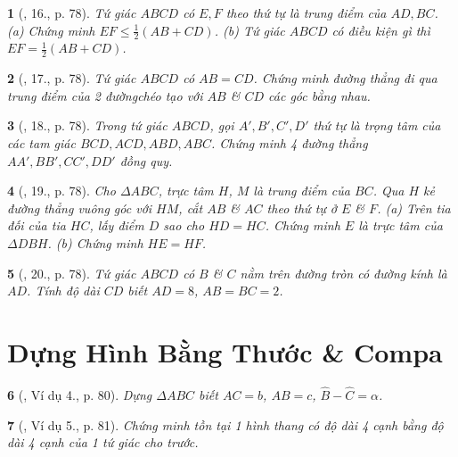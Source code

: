 \documentclass{article}
\newtheorem{baitoan}{}
\begin{document}
\begin{baitoan}[\cite{Binh_Toan_8_tap_1}, 16., p. 78]
	Tứ giác $ABCD$ có $E,F$ theo thứ tự là trung điểm của $AD,BC$. (a) Chứng minh $EF\le\frac{1}{2}(AB + CD)$. (b) Tứ giác $ABCD$ có điều kiện gì thì $EF = \frac{1}{2}(AB + CD)$.
\end{baitoan}

\begin{baitoan}[\cite{Binh_Toan_8_tap_1}, 17., p. 78]
	Tứ giác $ABCD$ có $AB = CD$. Chứng minh đường thẳng đi qua trung điểm của 2 đườngchéo tạo với $AB$ \& $CD$ các góc bằng nhau.
\end{baitoan}

\begin{baitoan}[\cite{Binh_Toan_8_tap_1}, 18., p. 78]
	Trong tứ giác $ABCD$, gọi $A',B',C',D'$ thứ tự là trọng tâm của các tam giác $BCD,ACD,ABD,ABC$. Chứng minh 4 đường thẳng $AA',BB',CC',DD'$ đồng quy.
\end{baitoan}

\begin{baitoan}[\cite{Binh_Toan_8_tap_1}, 19., p. 78]
	Cho $\Delta ABC$, trực tâm $H$, $M$ là trung điểm của $BC$. Qua $H$ kẻ đường thẳng vuông góc với $HM$, cắt $AB$ \& $AC$ theo thứ tự ở $E$ \& $F$. (a) Trên tia đối của tia $HC$, lấy điểm $D$ sao cho $HD = HC$. Chứng minh $E$ là trực tâm của $\Delta DBH$. (b) Chứng minh $HE = HF$.
\end{baitoan}

\begin{baitoan}[\cite{Binh_Toan_8_tap_1}, 20., p. 78]
	Tứ giác $ABCD$ có $B$ \& $C$ nằm trên đường tròn có đường kính là $AD$. Tính độ dài $CD$ biết $AD = 8$, $AB = BC = 2$.
\end{baitoan}


\section{Dựng Hình Bằng Thước \& Compa}

\begin{baitoan}[\cite{Binh_Toan_8_tap_1}, Ví dụ 4., p. 80]
	Dựng $\Delta ABC$ biết $AC = b$, $AB = c$, $\widehat{B} - \widehat{C} = \alpha$.
\end{baitoan}

\begin{baitoan}[\cite{Binh_Toan_8_tap_1}, Ví dụ 5., p. 81]
	Chứng minh tồn tại 1 hình thang có độ dài 4 cạnh bằng độ dài 4 cạnh của 1 tứ giác cho trước.
\end{baitoan}
\end{document}
